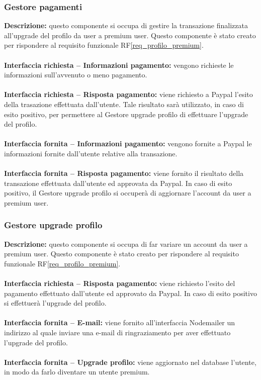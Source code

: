 \subsubsection{Gestore pagamenti}
\textbf{Descrizione:} questo componente si occupa di gestire la transazione finalizzata all’upgrade del profilo da user a premium user. Questo componente è stato creato per rispondere al requisito funzionale RF\ref{req_profilo_premium}. \\
\\
\textbf{Interfaccia richiesta – Informazioni pagamento:} vengono richieste le informazioni sull’avvenuto o meno pagamento. \\
\\
\textbf{Interfaccia richiesta – Risposta pagamento:} viene richiesto a Paypal l’esito della trasazione effettuata dall’utente. Tale risultato sarà utilizzato, in caso di esito positivo, per permettere al Gestore upgrade profilo di effettuare l’upgrade del profilo. \\
\\
\textbf{Interfaccia fornita – Informazioni pagamento:} vengono fornite a Paypal le informazioni fornite dall’utente relative alla transazione. \\
\\
\textbf{Interfaccia fornita – Risposta pagamento:} viene fornito il risultato della transazione effettuata dall’utente ed approvata da Paypal. In caso di esito positivo, il Gestore upgrade profilo si occuperà di aggiornare l’account da user a premium user.

\subsubsection{Gestore upgrade profilo}
\textbf{Descrizione:} questo componente si occupa di far variare un account da user a premium user. Questo componente è stato creato per rispondere al requisito funzionale RF\ref{req_profilo_premium}. \\
\\
\textbf{Interfaccia richiesta – Risposta pagamento:} viene richiesto l’esito del pagamento effettuato dall’utente ed approvato da Paypal. In caso di esito positivo si effettuerà l’upgrade del profilo. \\
\\
\textbf{Interfaccia fornita – E-mail:} viene fornito all’interfaccia Nodemailer un indirizzo al quale inviare una e-mail di ringraziamento per aver effettuato l’upgrade del profilo. \\
\\
\textbf{Interfaccia fornita – Upgrade profilo:} viene aggiornato nel database l'utente, in modo da farlo diventare un utente premium. \\

